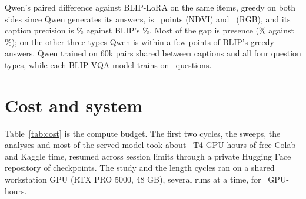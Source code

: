 \documentclass[10pt,twocolumn]{article}
\begin{document}
Qwen's paired difference against BLIP-LoRA on the same items, greedy on both sides since Qwen generates its answers, is \qwenNdviDiff\ points (NDVI) and \qwenRgbDiff\ (RGB), and its caption precision is \qwenNdviPrecision\% against BLIP's \blipFoldPrecision\%. Most of the gap is presence (\qwenRgbPresence\% against \blipFoldPresence\%); on the other three types Qwen is within a few points of BLIP's greedy answers. Qwen trained on 60k pairs shared between captions and all four question types, while each BLIP VQA model trains on \finalPairs\ questions.

\section{Cost and system}\label{sec:system}
\begin{table}[t]\centering\small
\resizebox{\columnwidth}{!}{}
\caption{What each group of training runs cost, from the run logs: trainable parameters (``--'' where the group mixes settings), the GPU, and GPU-hours including validation. Runs that shared the workstation GPU each count their own wall-clock hours. Scoring and robustness suites add about 15 T4 GPU-hours.}\label{tab:cost}
\end{table}
Table~\ref{tab:cost} is the compute budget. The first two cycles, the sweeps, the analyses and most of the served model took about \tfourHours\ T4 GPU-hours of free Colab and Kaggle time, resumed across session limits through a private Hugging Face repository of checkpoints. The study and the length cycles ran on a shared workstation GPU (RTX PRO 5000, 48 GB), several runs at a time, for \proHours\ GPU-hours.
\end{document}
